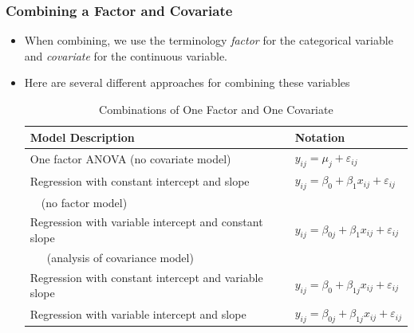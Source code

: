\begin{frame}%
\frametitle{Combining a Factor and Covariate}
\begin{itemize}
\item When combining, we use the
terminology \emph{factor} for the categorical variable and
\emph{covariate} for the continuous variable.
\item Here are several different approaches for combining these
variables

\begin{table}[h] \caption{Combinations of One Factor and One Covariate}
\begin{tabular}{ll}
\hline Model Description & Notation \\ \hline One factor ANOVA (no
covariate model) &
$y_{ij}=\mu _{j}+\varepsilon_{ij}$ \\
Regression with constant intercept and slope  & $y_{ij}=\beta _{0}+\beta _{1}x_{ij}+\varepsilon_{ij}$ \\
~~(no factor model) \\
Regression with variable intercept and constant slope &
$y_{ij}=\beta _{0j}+\beta _{1}x_{ij}+\varepsilon_{ij}$ \\
~~~(analysis of covariance model) &  \\
Regression with constant intercept and variable slope &
$y_{ij}=\beta _{0}+\beta _{1j}x_{ij}+\varepsilon_{ij}$ \\
Regression with variable intercept and slope &
$y_{ij}=\beta _{0j}+\beta _{1j}x_{ij}+\varepsilon_{ij}$ \\
\hline
\end{tabular}
\end{table}
\end{itemize}
\end{frame}



